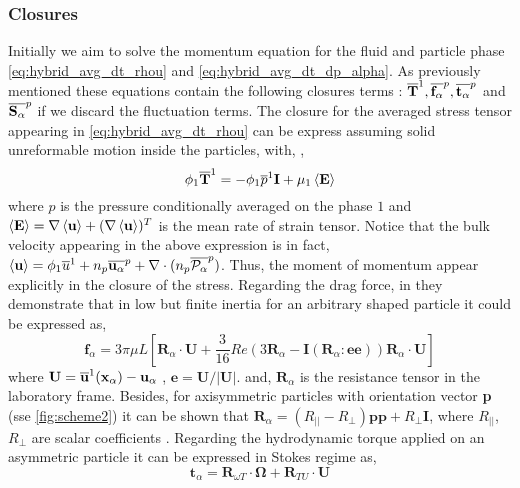 \subsubsection*{Closures}
Initially we aim to solve the momentum equation for the fluid and particle phase \ref{eq:hybrid_avg_dt_rhou} and \ref{eq:hybrid_avg_dt_dp_alpha}. 
As previously mentioned these equations contain the following closures terms : $\overline{\textbf{T}}^1, \overline{\textbf{f}_\alpha}^{p}, \overline{\textbf{t}_\alpha}^{p}$ and $\overline{\textbf{S}_\alpha}^{p}$ if we discard the fluctuation terms.
The closure for the averaged stress tensor appearing in \ref{eq:hybrid_avg_dt_rhou} can be express assuming solid unreformable motion inside the particles, with, \citep{jackson1997locally},
\begin{equation*}
    \phi_1\overline{\textbf{T}}^1
    =  - \phi_1\overline{p}^1\textbf{I}
    + \mu_1 \left<\textbf{E}\right>
\end{equation*}
where $p$ is the pressure conditionally averaged on the phase $1$ and $\left<\textbf{E}\right> = \mathbf{\nabla} \left<\textbf{u}\right> + (\mathbf{\nabla} \left<\textbf{u}\right>)^T$ is the mean rate of strain tensor. 
Notice that the bulk velocity appearing in the above expression is in fact, $\left<\textbf{u}\right> = \phi_1\overline{u}^1 + n_p\overline{\textbf{u}_\alpha}^{p} + \mathbf{\nabla}\cdot (n_p\overline{\mathcal{P}_\alpha}^{p})$.
Thus, the moment of momentum appear explicitly in the closure of the stress. 
Regarding the drag force, in  \citet{brenner1963resistance} they demonstrate that in low but finite inertia for an arbitrary shaped particle it could be expressed as,
\begin{equation}
    \textbf{f}_\alpha = 3 \pi \mu L \left[
        \textbf{R}_\alpha \cdot \textbf{U}
        + \frac{3}{16} Re  \left(
            3 \textbf{R}_\alpha 
            - \textbf{I} (\textbf{R}_\alpha : \textbf{e} \textbf{e})
        \right)
        \textbf{R}_\alpha\cdot  \textbf{U}
    \right]
\end{equation}
where $\textbf{U} = \overline{\textbf{u}}^1(\textbf{x}_\alpha)  - \textbf{u}_\alpha$ , $\textbf{e} = \textbf{U}/|\textbf{U}|$. 
and,  $\textbf{R}_\alpha$ is the resistance tensor in the laboratory frame. 
Besides, for axisymmetric particles with orientation vector \textbf{p} (sse \ref{fig:scheme2}) it can be shown that $\textbf{R}_\alpha = (R_{||} - R_\bot) \textbf{pp} + R_\bot \textbf{I}$, where $R_{||}$, $R_\bot$ are scalar coefficients \citep{guazzelli2011,kim2013microhydrodynamics}. 
Regarding the hydrodynamic torque applied on an asymmetric particle it can be expressed in Stokes regime as, 
\begin{equation}
    \textbf{t}_\alpha 
    = 
    \textbf{R}_{\omega T}\cdot \mathbf{\Omega}
     + \textbf{R}_{TU} \cdot \textbf{U} 
\end{equation}
